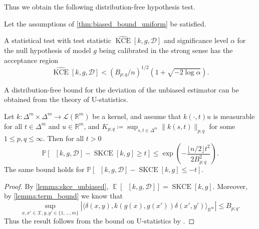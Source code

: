 \documentclass{article}
\DeclareMathOperator{\Expect}{\mathbb{E}}
\DeclareMathOperator{\kernelmeasure}{KCE}
\DeclareMathOperator{\squaredkernelmeasure}{SKCE}
\DeclareMathOperator{\unbiasedestimator}{\widehat{SKCE}_{uq}}
\begin{document}
Thus we obtain the following distribution-free hypothesis test.

\begin{corollary}
  Let the assumptions of \cref{thm:biased_bound_uniform} be satisfied.

  A statistical test with test statistic
  $\widehat{\kernelmeasure}[k, g, \mathcal{D}]$ and significance level
  $\alpha$ for the null hypothesis of model $g$ being calibrated in the strong
  sense has the acceptance region
  \begin{equation*}
    \widehat{\kernelmeasure}[k, g, \mathcal{D}] < {(B_{p;q} / n)}^{1/2} (1 + \sqrt{-2\log \alpha}).
  \end{equation*}
\end{corollary}

A distribution-free bound for the deviation of the unbiased estimator can be
obtained from the theory of U-statistics.

\begin{theorem}\label{thm:unbiased_bound_uniform}
  Let $k \colon \Delta^m \times \Delta^m \to \mathcal{L}(\mathbb{R}^m)$ be a
  kernel, and assume
  that $k(\cdot,t)u$ is measurable for all $t \in \Delta^m$ and
  $u \in \mathbb{R}^m$, and
  $K_{p;q} \coloneqq \sup_{s,t \in \Delta^m} \|k(s,t)\|_{p;q}$ for some
  $1 \leq p,q \leq \infty$. Then for all $t > 0$
  \begin{equation*}
    \mathbb{P}\left[\unbiasedestimator[k, g, \mathcal{D}] - \squaredkernelmeasure[k, g] \geq t\right] \leq \exp{\left(-\frac{\lfloor n/2 \rfloor t^2}{2 B_{p;q}^2}\right)}.
  \end{equation*}
  The same bound holds for
  $\mathbb{P}\left[\unbiasedestimator[k, g, \mathcal{D}] - \squaredkernelmeasure[k, g] \leq -t\right]$.
\end{theorem}

\begin{proof}
  By \cref{lemma:skce_unbiased},
  $\Expect[\unbiasedestimator[k, g, \mathcal{D}]] = \squaredkernelmeasure[k, g]$.
  Moreover, by \cref{lemma:term_bound} we know that
  \begin{equation*}
    \sup_{x,x' \in \mathcal{X}, y,y' \in \{1,\ldots,m\}} \left|\langle \delta(x,y), k(g(x),g(x')) \delta(x',y')\rangle_{\mathbb{R}^m} \right| \leq B_{p;q}.
  \end{equation*}
  Thus the result follows from the bound on U-statistics by
  \citet[p.~25]{hoeffding63_probab_inequal_sums_bound_random_variab}.
\end{proof}
\end{document}
